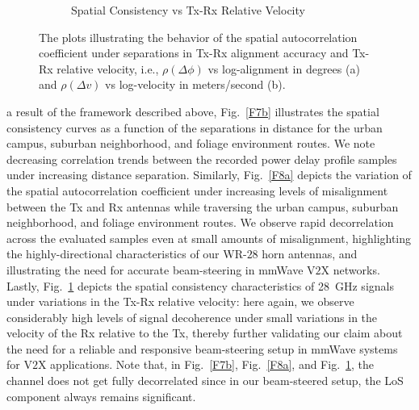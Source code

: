 \documentclass[12pt, draftcls, onecolumn]{IEEEtran}
\begin{document}
{\begin{figure} [t]
\begin{subfigure}{0.4885\linewidth}
        \caption{Spatial Consistency vs Tx-Rx Relative Velocity}
        \label{F8b}
    \end{subfigure}
    \vspace{-8mm}
    \caption{The plots illustrating the behavior of the spatial autocorrelation coefficient under separations in Tx-Rx alignment accuracy and Tx-Rx relative velocity, i.e., $\rho(\Delta \phi)$ vs log-alignment in degrees (a) and $\rho(\Delta v)$ vs log-velocity in meters/second (b).}
    \label{F8}
\end{figure}
 a result of the framework described above, Fig.~\ref{F7b} illustrates the spatial consistency curves as a function of the separations in distance for the urban campus, suburban neighborhood, and foliage environment routes. We note decreasing correlation trends between the recorded power delay profile samples under increasing distance separation. Similarly, Fig.~\ref{F8a} depicts the variation of the spatial autocorrelation coefficient under increasing levels of misalignment between the Tx and Rx antennas while traversing the urban campus, suburban neighborhood, and foliage environment routes. We observe rapid decorrelation across the evaluated samples even at small amounts of misalignment, highlighting the highly-directional characteristics of our WR-$28$ horn antennas, and illustrating the need for accurate beam-steering in mmWave V$2$X networks. Lastly, Fig.~\ref{F8b} depicts the spatial consistency characteristics of \SI{28}{\giga\hertz} signals under variations in the Tx-Rx relative velocity: here again, we observe considerably high levels of signal decoherence under small variations in the velocity of the Rx relative to the Tx, thereby further validating our claim about the need for a reliable and responsive beam-steering setup in mmWave systems for V$2$X applications. Note that, in Fig.~\ref{F7b}, Fig.~\ref{F8a}, and Fig.~\ref{F8b}, the channel does not get fully decorrelated since in our beam-steered setup, the LoS component always remains significant.
\begin{figure} [t]
    \centering
    \begin{subfigure}{0.4815\linewidth}
        \centering

\end{subfigure}
\end{figure}}
\end{document}
